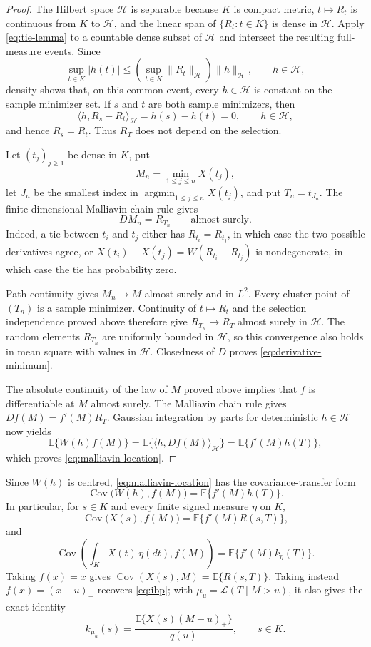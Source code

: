 \documentclass[11pt]{amsart}
\theoremstyle{definition}
\theoremstyle{remark}
\DeclareMathOperator*{\Cov}{Cov}
\DeclareMathOperator*{\argmin}{argmin}
\newcommand{\Ee}{\mathbb E}
\newcommand{\cH}{\mathcal H}
\begin{document}
\begin{proof}
The Hilbert space $\cH$ is separable because $K$ is compact metric,
$t\mapsto R_t$ is continuous from $K$ to $\cH$, and the linear span of
$\{R_t:t\in K\}$ is dense in $\cH$.  Apply \eqref{eq:tie-lemma} to a
countable dense subset of $\cH$ and intersect the resulting full-measure
events.  Since
\[
 \sup_{t\in K}|h(t)|
 \leq\left(\sup_{t\in K}\|R_t\|_{\cH}\right)\|h\|_{\cH},
 \qquad h\in\cH,
\]
density shows that, on this common event, every $h\in\cH$ is constant on
the sample minimizer set.  If $s$ and $t$ are both sample minimizers,
then
\[
 \langle h,R_s-R_t\rangle_{\cH}=h(s)-h(t)=0,
 \qquad h\in\cH,
\]
and hence $R_s=R_t$.  Thus $R_T$ does not depend on the selection.

Let $(t_j)_{j\geq1}$ be dense in $K$, put
\[
 M_n=\min_{1\leq j\leq n}X(t_j),
\]
let $J_n$ be the smallest index in
$\argmin_{1\leq j\leq n}X(t_j)$, and put $T_n=t_{J_n}$.
The finite-dimensional Malliavin chain rule gives
\[
 DM_n=R_{T_n}\qquad\text{almost surely}.
\]
Indeed, a tie between $t_i$ and $t_j$ either has
$R_{t_i}=R_{t_j}$, in which case the two possible derivatives agree, or
$X(t_i)-X(t_j)=W(R_{t_i}-R_{t_j})$ is nondegenerate, in which case the
tie has probability zero.

Path continuity gives $M_n\to M$ almost surely and in $L^2$.  Every
cluster point of $(T_n)$ is a sample minimizer.  Continuity of
$t\mapsto R_t$ and the selection independence proved above therefore
give $R_{T_n}\to R_T$ almost surely in $\cH$.  The random elements
$R_{T_n}$ are uniformly bounded in $\cH$, so this convergence also holds
in mean square with values in $\cH$.  Closedness of $D$ proves
\eqref{eq:derivative-minimum}.

The absolute continuity of the law of $M$ proved above implies that $f$
is differentiable at $M$ almost surely.  The Malliavin chain rule gives
$Df(M)=f'(M)R_T$.  Gaussian integration by parts for deterministic
$h\in\cH$ now yields
\[
 \Ee\{W(h)f(M)\}
 =\Ee\{\langle h,Df(M)\rangle_{\cH}\}
 =\Ee\{f'(M)h(T)\},
\]
which proves \eqref{eq:malliavin-location}.
\end{proof}

Since $W(h)$ is centred, \eqref{eq:malliavin-location} has the
covariance-transfer form
\begin{equation}
 \Cov\bigl(W(h),f(M)\bigr)=\Ee\bigl\{f'(M)h(T)\bigr\}.
 \label{eq:covariance-transfer}
\end{equation}
In particular, for $s\in K$ and every finite signed measure $\eta$ on
$K$,
\[
 \Cov\bigl(X(s),f(M)\bigr)=\Ee\bigl\{f'(M)R(s,T)\bigr\},
\]
and
\[
 \Cov\left(\int_KX(t)\,\eta(dt),f(M)\right)
 =\Ee\bigl\{f'(M)k_\eta(T)\bigr\}.
\]
Taking $f(x)=x$ gives $\Cov(X(s),M)=\Ee\{R(s,T)\}$.  Taking instead
$f(x)=(x-u)_+$ recovers \eqref{eq:ibp}; with
$\mu_u=\mathcal L(T\mid M>u)$, it also gives the exact
identity
\[
 k_{\mu_u}(s)
 =\frac{\Ee\{X(s)(M-u)_+\}}{q(u)},\qquad s\in K.
\]
 
\end{document}
